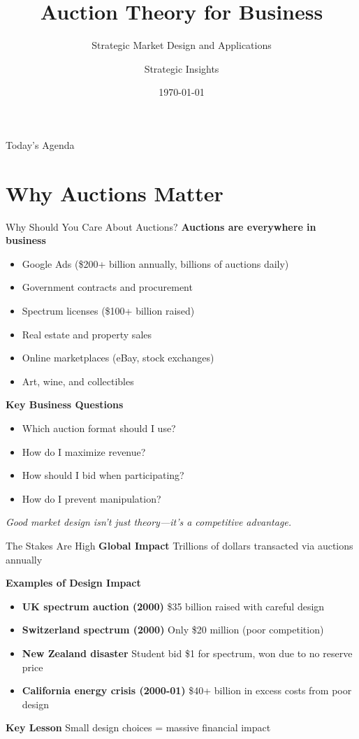\documentclass[xcolor={x11names}]{beamer}
\title{Auction Theory for Business}
\subtitle{Strategic Market Design and Applications}
\author{Strategic Insights}
\date{\today}
\begin{document}
\begin{frame}
  \titlepage
\end{frame}

\begin{frame}{Today's Agenda}
  \tableofcontents
\end{frame}



\part{Why Auctions Matter}

\begin{frame}{Why Should You Care About Auctions?}
\textbf{Auctions are everywhere in business}
\begin{itemize}
  \item Google Ads (\$200+ billion annually, billions of auctions daily)
  \item Government contracts and procurement
  \item Spectrum licenses (\$100+ billion raised)
  \item Real estate and property sales
  \item Online marketplaces (eBay, stock exchanges)
  \item Art, wine, and collectibles
\end{itemize}


\textbf{Key Business Questions}
\begin{itemize}
  \item Which auction format should I use?
  \item How do I maximize revenue?
  \item How should I bid when participating?
  \item How do I prevent manipulation?
\end{itemize}


\textit{Good market design isn't just theory—it's a competitive advantage.}
\end{frame}

\begin{frame}{The Stakes Are High}
\textbf{Global Impact} Trillions of dollars transacted via auctions annually


\textbf{Examples of Design Impact}
\begin{itemize}
  \item \textbf{UK spectrum auction (2000)} \$35 billion raised with careful design
  \item \textbf{Switzerland spectrum (2000)} Only \$20 million (poor competition)
  \item \textbf{New Zealand disaster} Student bid \$1 for spectrum, won due to no reserve price
  \item \textbf{California energy crisis (2000-01)} \$40+ billion in excess costs from poor design
\end{itemize}


\textbf{Key Lesson} Small design choices = massive financial impact
\end{frame}
\end{document}
